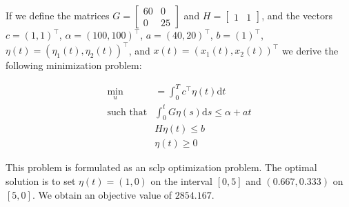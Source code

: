 \documentclass[11pt,a4paper,titlepage]{article}
\theoremstyle{definition}
\begin{document}
{    If we define the matrices
    $
        G =
        \begin{bmatrix}
            60 & 0 \\
            0 & 25
        \end{bmatrix}
    $
    and
    $
        H =
        \begin{bmatrix}
            1 & 1
        \end{bmatrix}
    $,
    and the vectors
    $
        c = (1,1)^\top
    $,
    $
        \alpha = (100,100)^\top
    $,
    $
        a = (40,20)^\top
    $,
    $
        b = (1)^\top
    $,
    $
        \eta(t) = (\eta_1(t), \eta_2(t))^\top
    $,
    and
    $
        x(t) = (x_1(t), x_2(t))^\top
    $
    we derive the following minimization problem:

    \begin{align}
        \min\limits_{u} & = \int_0^T c^\top \eta(t) \mathrm{d}t \\
        \text{such that} & \int_0^t G \eta(s) \mathrm{d}s \leq \alpha + a t \\
            & H \eta(t) \leq b \\
            & \eta(t) \geq 0
    \end{align}

    This problem is formulated as an \gls{sclp} optimization problem.
    The optimal solution is to set $\eta(t) = (1,0)$
    on the interval $[0,5]$
    and $(0.667, 0.333)$ on $[5,0]$.
    We obtain an objective value of $2854.167$.

}
\end{document}
